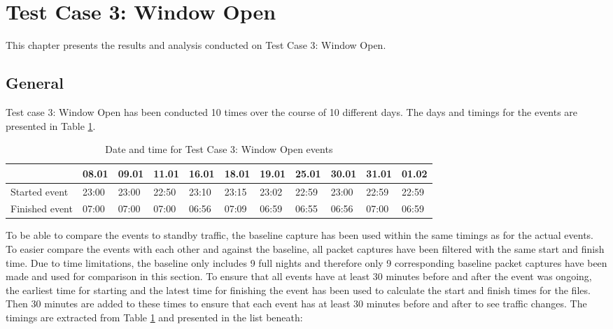 \newpage
\section{Test Case 3: Window Open}
This chapter presents the results and analysis conducted on Test Case 3: Window Open. 
\subsection{General}
Test case 3: Window Open has been conducted 10 times over the course of 10 different days. The days and timings for the events are presented in Table \ref{tab:WindowDates}.

\begin{table}[H]
    \centering
    \caption{Date and time for Test Case 3: Window Open events}
    \begin{adjustbox}{width=1\textwidth} 
            \begin{tabular}{l|l|l|l|l|l|l|l|l|l|l|}
                \cline{2-11}
                & 08.01 & 09.01 & 11.01 & 16.01 & 18.01 & 19.01 & 25.01 & 30.01 & 31.01 & 01.02 \\ \hline
                \multicolumn{1}{|l|}{Started event}  & 23:00 & 23:00 & 22:50 & 23:10 & 23:15 & 23:02 & 22:59 & 23:00 & 22:59 & 22:59 \\ \hline
                \multicolumn{1}{|l|}{Finished event} & 07:00 & 07:00 & 07:00 & 06:56 & 07:09 & 06:59 & 06:55 & 06:56 & 07:00 & 06:59 \\ \hline
            \end{tabular}
    \end{adjustbox}
    \label{tab:WindowDates}
\end{table}

To be able to compare the events to standby traffic, the baseline capture has been used within the same timings as for the actual events. To easier compare the events with each other and against the baseline, all packet captures have been filtered with the same start and finish time. Due to time limitations, the baseline only includes 9 full nights and therefore only 9 corresponding baseline packet captures have been made and used for comparison in this section. To ensure that all events have at least 30 minutes before and after the event was ongoing, the earliest time for starting and the latest time for finishing the event has been used to calculate the start and finish times for the files. Then 30 minutes are added to these times to ensure that each event has at least 30 minutes before and after to see traffic changes. The timings are extracted from Table \ref{tab:WindowDates} and presented in the list beneath: 

